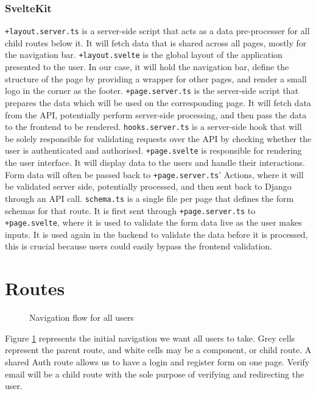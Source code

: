 \subsubsection{SvelteKit}
\texttt{+layout.server.ts} is a server-side script that acts as a data pre-processer for all child routes below it. It will fetch data that is shared across all pages, mostly for the navigation bar. \texttt{+layout.svelte} is the global layout of the application presented to the user. In our case, it will hold the navigation bar, define the structure of the page by providing a wrapper for other pages, and render a small logo in the corner as the footer. \texttt{+page.server.ts} is the server-side script that prepares the data which will be used on the corresponding page. It will fetch data from the API, potentially perform server-side processing, and then pass the data to the frontend to be rendered. \texttt{hooks.server.ts} is a server-side hook that will be solely responsible for validating requests over the API by checking whether the user is authenticated and authorised. \texttt{+page.svelte} is responsible for rendering the user interface. It will display data to the users and handle their interactions. Form data will often be passed back to \texttt{+page.server.ts}' Actions, where it will be validated server side, potentially processed, and then sent back to Django through an API call. \texttt{schema.ts} is a single file per page that defines the form schemas for that route. It is first sent through \texttt{+page.server.ts} to \texttt{+page.svelte}, where it is used to validate the form data live as the user makes inputs. It is used again in the backend to validate the data before it is processed, this is crucial because users could easily bypass the frontend validation.

\section{Routes} \label{Routes}

\begin{figure}[H]
\centering
{}
\vspace{-5pt}
\caption{Navigation flow for all users}
\label{fig:ui-all}
\vspace{-20pt}
\end{figure}
Figure \ref{fig:ui-all} represents the initial navigation we want all users to take. Grey cells represent the parent route, and white cells may be a component, or child route. A shared Auth route allows us to have a login and register form on one page. Verify email will be a child route with the sole purpose of verifying and redirecting the user. 

